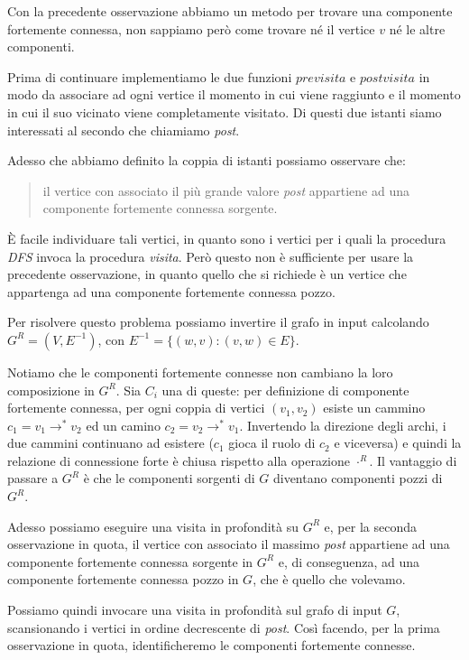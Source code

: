 Con la precedente osservazione abbiamo un metodo per trovare una
componente fortemente connessa, non sappiamo per\`o come trovare n\'e il
vertice $v$ n\'e le altre componenti.

Prima di continuare implementiamo le due funzioni $previsita$ e
$postvisita$ in modo da associare ad ogni vertice il momento in
cui viene raggiunto e il momento in cui il suo vicinato viene
completamente visitato. Di questi due istanti siamo interessati al
secondo che chiamiamo \emph{post}.

Adesso che abbiamo definito la coppia di istanti possiamo osservare
che: 
\begin{quotation}
  il vertice con associato il pi\`u grande valore \emph{post}
  appartiene ad una componente fortemente connessa sorgente.
\end{quotation}

\`E facile individuare tali vertici, in quanto sono i vertici per i
quali la procedura \emph{DFS} invoca la procedura
\emph{visita}. Per\`o questo non \`e sufficiente per usare la
precedente osservazione, in quanto quello che si richiede \`e un
vertice che appartenga ad una componente fortemente connessa pozzo.

Per risolvere questo problema possiamo invertire il grafo in input
calcolando $G^{R} = (V, E^{-1})$, con $E^{-1} = \{(w, v): (v, w) \in
E\}$.

Notiamo che le componenti fortemente connesse non cambiano la loro
composizione in $G^{R}$. Sia $C_{i}$ una di queste: per definizione di
componente fortemente connessa, per ogni coppia di vertici $(v_{1},
v_{2})$ esiste un cammino $c_{1} = v_{1}\rightarrow^{*} v_{2}$ ed un
camino $c_{2} = v_{2}\rightarrow^{*} v_{1}$. Invertendo la direzione
degli archi, i due cammini continuano ad esistere ($c_{1}$ gioca il
ruolo di $c_{2}$ e viceversa) e quindi la relazione di connessione
forte \`e chiusa rispetto alla operazione $\cdot ^{R}$. Il vantaggio
di passare a $G^{R}$ \`e che le componenti sorgenti di $G$ diventano
componenti pozzi di $G^{R}$.

Adesso possiamo eseguire una visita in profondit\`a su $G^{R}$
e, per la seconda osservazione in quota, il vertice con associato il
massimo \emph{post} appartiene ad una componente fortemente connessa
sorgente in $G^{R}$ e, di conseguenza, ad una componente fortemente
connessa pozzo in $G$, che \`e quello che volevamo.

Possiamo quindi invocare una visita in profondit\`a sul grafo di input
$G$, scansionando i vertici in ordine decrescente di
\emph{post}. Cos\`i facendo, per la prima osservazione in quota,
identificheremo le componenti fortemente connesse.

